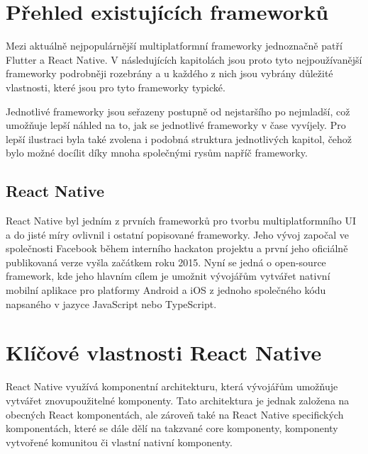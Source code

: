 \section{Přehled existujících frameworků}
Mezi aktuálně nejpopulárnější multiplatformní frameworky jednoznačně patří Flutter a React Native. \cite{crossPlatformFrameworksStats}
V následujících kapitolách jsou proto tyto nejpoužívanější frameworky podrobněji rozebrány a u každého z nich jsou vybrány 
důležité vlastnosti, které jsou pro tyto frameworky typické. 

Jednotlivé frameworky jsou seřazeny postupně od nejstaršího
po nejmladší, což umožňuje lepší náhled na to, jak se jednotlivé frameworky v čase vyvíjely. Pro lepší ilustraci byla také zvolena 
i podobná struktura jednotlivých kapitol, čehož bylo možné docílit díky mnoha společnými rysům napříč frameworky.

\subsection{React Native}
React Native byl jedním z prvních frameworků pro tvorbu multiplatformního UI a do jisté míry ovlivnil i ostatní popisované
frameworky. Jeho vývoj započal ve společnosti Facebook během interního hackaton projektu a první jeho oficiálně publikovaná
verze vyšla začátkem roku 2015. \cite{reactNativeHistory}
Nyní se jedná o open-source framework, kde jeho hlavním cílem je umožnit vývojářům vytvářet nativní mobilní aplikace 
pro platformy Android a iOS z jednoho společného kódu napsaného v jazyce JavaScript nebo TypeScript.

\section*{Klíčové vlastnosti React Native}

React Native využívá komponentní architekturu, která vývojářům umožňuje 
vytvářet znovupoužitelné komponenty. \cite{reactNativeComponents} Tato architektura je jednak založena na obecných
React komponentách, ale zároveň také na React Native specifických komponentách, které se dále dělí na takzvané core
komponenty, komponenty vytvořené komunitou či vlastní nativní komponenty. \cite{reactNativeComponents}

    
